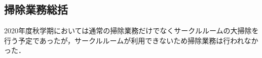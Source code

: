 \subsection*{掃除業務総括}

2020年度秋学期においては通常の掃除業務だけでなくサークルルームの大掃除を行う予定であったが，サークルルームが利用できないため掃除業務は行われなかった．
